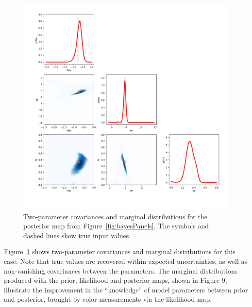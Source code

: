 \begin{figure}[t!]
  \includegraphics[width=1.0\textwidth,angle=0]{figures/cornerPlot3_ex1.png}
  \vskip -0.5in
\caption{Two-parameter covariances and marginal distributions for
  the posterior map from Figure~\ref{fig:bayesPanels}. The symbols and
  dashed lines show true input values.}
\label{fig:cornerPlot3ex1}
\end{figure}


Figure~\ref{fig:cornerPlot3ex1} shows two-parameter covariances and marginal distributions for this case.
Note that true values are recovered within expected uncertainties, as well as non-vanishing covariances
between the parameters. The marginal distributions produced with the prior, likelihood and posterior maps,
shown in
Figure 9,
illustrate the improvement in the ``knowledge'' of model
parameters between prior and posterior, brought by color measurements via the likelihood map. 




